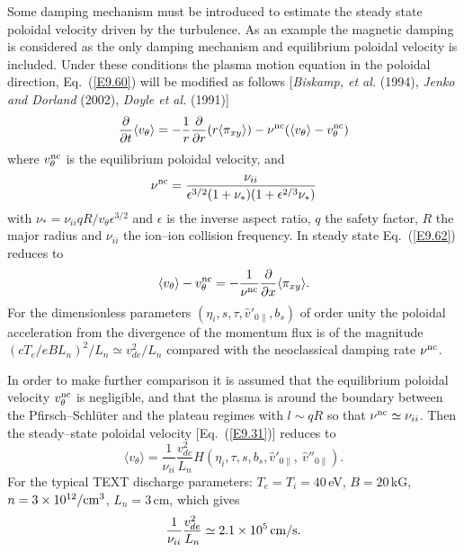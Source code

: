 \documentclass[a4paper,openany,12pt]{book}
\begin{document}
{Some damping mechanism must be introduced to estimate the steady state poloidal velocity driven by the turbulence. As an example the magnetic damping is considered as the only damping mechanism and equilibrium poloidal velocity is included. Under these conditions the plasma motion equation in the poloidal direction, Eq.~(\ref{E9.60}) will be modified as follows [\emph{Biskamp, et al.} (1994), \emph{Jenko and Dorland} (2002), \emph{Doyle et al.} (1991)]
\begin{equation}
\frac{\partial}{\partial t}\langle v_\theta\rangle=-\frac{1}{r}\frac{\partial}{\partial r}(r\langle\pi_{xy}\rangle)-\nu^{\rm nc}(\langle v_\theta\rangle-v_\theta^{\rm nc})\label{E9.62}
\end{equation}
where $v_\theta^{\rm nc}$ is the equilibrium poloidal velocity, and
\begin{equation}
\nu^{\rm nc}=\frac{\nu_{ii}}{\epsilon^{3/2}(1+\nu_*)(1+\epsilon^{2/3}\nu_*)}\label{E9.63}
\end{equation}
with $\nu_*=\nu_{ii}qR/v_\theta\epsilon^{3/2}$ and $\epsilon$ is the inverse aspect ratio, 
$q$ the safety factor, $R$ the major radius and $\nu_{ii}$ the ion--ion collision frequency. In steady state Eq.~(\ref{E9.62}) reduces to
\begin{equation}
\langle v_\theta\rangle-v_\theta^{\rm nc}=-\frac{1}{\nu^{\rm nc}}\frac{\partial}{\partial x}\langle\pi_{xy}\rangle.\label{E9.64}
\end{equation}
For the dimensionless parameters $(\eta_i, s, \tau, \widehat v'_{0\|}, b_s)$ of order unity the poloidal acceleration from the divergence of the momentum flux is of the magnitude $(cT_e/eBL_n)^2/L_n\simeq v_{de}^2/L_n$ compared with the neoclassical damping rate $\nu^{\rm nc}$.

In order to make further comparison it is assumed that the equilibrium poloidal velocity $v_\theta^{\rm nc}$ is negligible, and that the plasma is around the boundary between the Pfirsch--Schl\"uter and the plateau regimes with $l\sim qR$ so that $\nu^{\rm nc}\simeq\nu_{ii}$. Then the steady--state poloidal velocity [Eq.~(\ref{E9.31})] reduces to
\begin{equation}
\langle v_\theta\rangle=\frac{1}{\nu_{ii}}\frac{v_{de}^2}{L_n}H\left(\eta_i, \tau, s, b_s,\widehat v'_{0\|},\ \widehat v''_{0\|}\right).\label{E9.65}
\end{equation}
For the typical TEXT discharge parameters: $T_e=T_i=40\,$eV, $B=20\,$kG, $n=3\times 10^{12}/\rm{cm}^3$, $L_n=3\,$cm, which gives
$${1\over\nu_{ii}}\frac{v_{de}^2}{L_n}\simeq 2.1\times 10^5\,\rm cm/s.$$

}
\end{document}
